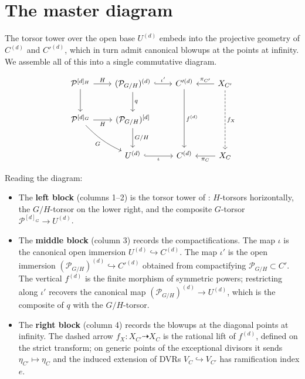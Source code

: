 \documentclass[12pt]{amsart}
\newcommand{\cP}{\mathcal{P}}
\theoremstyle{remark}
\begin{document}
\section{The master diagram}\label{sec:master}

The torsor tower over the open base $U^{(d)}$ embeds into the projective
geometry of $C^{(d)}$ and $C'^{(d)}$, which in turn admit canonical blowups
at the points at infinity. We assemble all of this into a single commutative
diagram.

\[
\begin{tikzcd}[row sep=2.4em, column sep=2.2em]
\cP^{[d]_H} \ar[r,"H"] \ar[d]
  & (\cP_{G/H})^{(d)} \ar[d,"q"] \ar[r,hookrightarrow,"\iota'"]
  & C'^{(d)} \ar[dd,"f^{(d)}"]
  & X_{C'} \ar[l,"\pi_{C'}"'] \ar[dd,dashed,"f_X"] \\
\cP^{[d]_G} \ar[r,"H"'] \ar[dr,"G"',bend right=10]
  & (\cP_{G/H})^{[d]} \ar[d,"G/H"]
  & & \\
  & U^{(d)} \ar[r,hookrightarrow,"\iota"']
  & C^{(d)}
  & X_C \ar[l,"\pi_C"]
\end{tikzcd}
\]

Reading the diagram:
\begin{itemize}
  \item The \textbf{left block} (columns 1--2) is the torsor tower of
        : $H$-torsors horizontally, the
        $G/H$-torsor on the lower right, and the composite $G$-torsor
        $\cP^{[d]_G} \to U^{(d)}$.
  \item The \textbf{middle block} (column 3) records the compactifications.
        The map $\iota$ is the canonical open immersion
        $U^{(d)} \hookrightarrow C^{(d)}$. The map $\iota'$ is the open
        immersion $(\cP_{G/H})^{(d)} \hookrightarrow C'^{(d)}$ obtained from
        compactifying $\cP_{G/H} \subset C'$. The vertical $f^{(d)}$ is the
        finite morphism of symmetric powers; restricting along $\iota'$
        recovers the canonical map $(\cP_{G/H})^{(d)} \to U^{(d)}$, which is
        the composite of $q$ with the $G/H$-torsor.
  \item The \textbf{right block} (column 4) records the blowups at the
        diagonal points at infinity. The dashed arrow
        $f_X \colon X_{C'} \dashrightarrow X_C$ is the rational lift of
        $f^{(d)}$, defined on the strict transform; on generic points of
        the exceptional divisors it sends $\eta_{C'} \mapsto \eta_C$ and the
        induced extension of DVRs $V_C \hookrightarrow V_{C'}$ has
        ramification index $e$.
\end{itemize}
\end{document}
